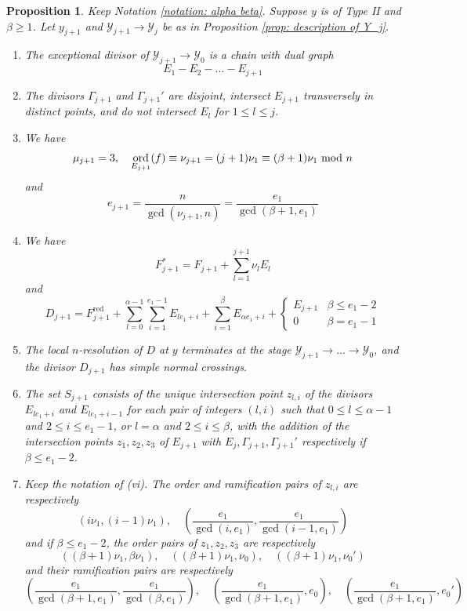 \documentclass[12pt]{amsart}
\numberwithin{equation}{section}
\newtheorem{prop}[equation]{Proposition}
\theoremstyle{definition}
\newcommand{\Y}{\mathcal{Y}}
\DeclareMathOperator{\red}{red}
\DeclareMathOperator{\ord}{ord}
\begin{document}
\begin{prop}\label{prop: full local resolution for type II}
    Keep Notation \ref{notation: alpha beta}. Suppose $y$ is of Type II and $\beta\geq1$. Let $y_{j+1}$ and $\Y_{j+1}\to\Y_j$ be as in Proposition \ref{prop: description of Y_j}.
    \begin{enumerate}[\upshape (i)]
        \item The exceptional divisor of $\Y_{j+1}\to\Y_0$ is a chain with dual graph \[E_1-E_2-...-E_{j+1}\]
        \item The divisors $\Gamma_{j+1}$ and $\Gamma_{j+1}'$ are disjoint, intersect $E_{j+1}$ transversely in distinct points, and do not intersect $E_l$ for $1\leq l\leq j$.
        \item We have
        \[\mu_{j+1}=3,\quad \ord_{E_{j+1}}(f)\equiv\nu_{j+1}=(j+1)\nu_1\equiv(\beta+1)\nu_1\textup{ mod }n\]
        and
        \[e_{j+1}=\frac{n}{\gcd(\nu_{j+1},n)}=\frac{e_1}{\gcd(\beta+1,e_1)}\]
        \item We have \[F_{j+1}^*=F_{j+1}+\sum_{l=1}^{j+1} \nu_l E_l\] and
        \[D_{j+1}=F_{j+1}^{\red}+\sum_{l=0}^{\alpha-1}\sum_{i=1}^{e_1-1} E_{le_1+i}+\sum_{i=1}^\beta E_{\alpha e_1+i}+\begin{cases}
           E_{j+1} &\beta\leq e_1-2\\
           0 &\beta=e_1-1
        \end{cases}\]
        \item The local $n$-resolution of $D$ at $y$ terminates at the stage $\Y_{j+1}\to...\to\Y_0$, and the divisor $D_{j+1}$ has simple normal crossings.
        \item The set $S_{j+1}$ consists of the unique intersection point $z_{l,i}$ of the divisors $E_{le_1+i}$ and $E_{le_1+i-1}$ for each pair of integers $(l,i)$ such that $0\leq l\leq\alpha-1$ and $2\leq i\leq e_1-1$, or $l=\alpha$ and $2\leq i\leq \beta$, with the addition of the intersection points $z_1,z_2,z_3$ of $E_{j+1}$ with $E_j,\Gamma_{j+1},\Gamma_{j+1}'$ respectively if $\beta\leq e_1-2$.
        \item Keep the notation of \textup{(vi)}.
        The order and ramification pairs of $z_{l,i}$ are respectively \[(i\nu_1,(i-1)\nu_1),\quad(\frac{e_1}{\gcd(i,e_1)},\frac{e_1}{\gcd(i-1,e_1)})\] and if $\beta\leq e_1-2$, the order pairs of $z_1,z_2,z_3$ are respectively
        \[((\beta+1)\nu_1,\beta\nu_1),\quad((\beta+1)\nu_1,\nu_0),\quad((\beta+1)\nu_1,\nu_0')\]
        and their ramification pairs are respectively \[(\frac{e_1}{\gcd(\beta+1,e_1)},\frac{e_1}{\gcd(\beta,e_1)}),\quad (\frac{e_1}{\gcd(\beta+1,e_1)},e_0),\quad(\frac{e_1}{\gcd(\beta+1,e_1)},e_0')\]
    \end{enumerate}
\end{prop}
\end{document}
